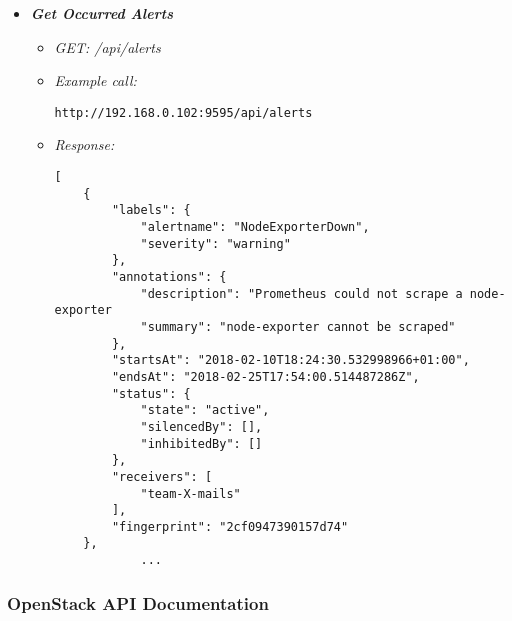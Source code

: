 \begin{itemize}
\item \textbf{\textit{Get Occurred Alerts}}
\begin{itemize}
\item \emph{GET: /api/alerts}
\item \emph{Example call:}
 \begin{lstlisting}
http://192.168.0.102:9595/api/alerts
\end{lstlisting}

\item \emph{Response:}
 \begin{lstlisting}
[
    {
        "labels": {
            "alertname": "NodeExporterDown",
            "severity": "warning"
        },
        "annotations": {
            "description": "Prometheus could not scrape a node-exporter 
            "summary": "node-exporter cannot be scraped"
        },
        "startsAt": "2018-02-10T18:24:30.532998966+01:00",
        "endsAt": "2018-02-25T17:54:00.514487286Z",
        "status": {
            "state": "active",
            "silencedBy": [],
            "inhibitedBy": []
        },
        "receivers": [
            "team-X-mails"
        ],
        "fingerprint": "2cf0947390157d74"
    },
            ...
\end{lstlisting}
\end{itemize}

\end{itemize}


\subsubsection{OpenStack API Documentation}\label{OpenStack API Documentation}

